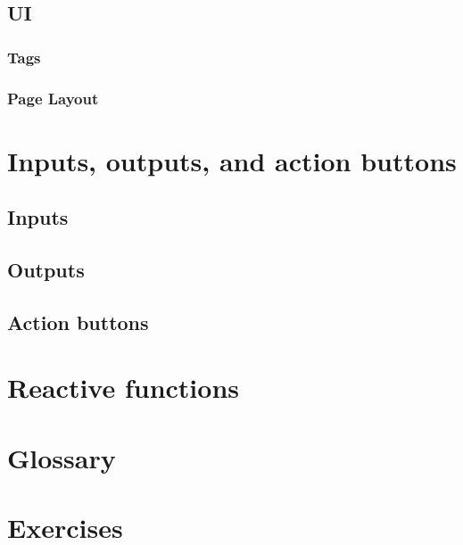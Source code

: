 \documentclass[
]{book}
\begin{document}
\hypertarget{ui}{%
\subsection{UI}\label{ui}}

\hypertarget{tags}{%
\subsubsection{Tags}\label{tags}}

\hypertarget{page-layout}{%
\subsubsection{Page Layout}\label{page-layout}}

\hypertarget{inputs-outputs-and-action-buttons}{%
\section{Inputs, outputs, and action buttons}\label{inputs-outputs-and-action-buttons}}

\hypertarget{inputs-intro}{%
\subsection{Inputs}\label{inputs-intro}}

\hypertarget{outputs-intro}{%
\subsection{Outputs}\label{outputs-intro}}

\hypertarget{action-buttons}{%
\subsection{Action buttons}\label{action-buttons}}

\hypertarget{reactive-functions}{%
\section{Reactive functions}\label{reactive-functions}}

\hypertarget{glossary-first-app}{%
\section{Glossary}\label{glossary-first-app}}

\hypertarget{exercises-first-app}{%
\section{Exercises}\label{exercises-first-app}}
\end{document}
